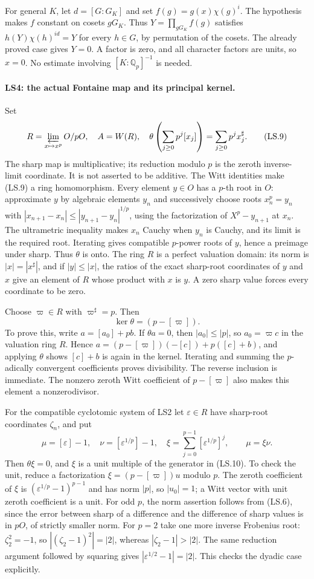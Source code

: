 For general $K$, let $d=[G:G_K]$ and set
$f(g)=g(x)\chi(g)^i$. The hypothesis makes $f$ constant on cosets
$gG_K$. Thus $Y=\prod_{gG_K}f(g)$ satisfies
$h(Y)\chi(h)^{id}=Y$ for every $h\in G$, by permutation of the
cosets. The already proved case gives $Y=0$. A factor is zero, and
all character factors are units, so $x=0$. No estimate involving
$[K:\mathbb Q_p]^{-1}$ is needed.

\paragraph{LS4: the actual Fontaine map and its principal kernel.}
Set
\[
 R=\varprojlim_{x\mapsto x^p}O/pO,\quad A=W(R),\quad
 \theta\left(\sum_{j\ge0}p^j[x_j]\right)
       =\sum_{j\ge0}p^j x_j^\sharp .                \tag{LS.9}
\]
The sharp map is multiplicative; its reduction modulo $p$ is the
zeroth inverse-limit coordinate. It is not asserted to be additive.
The Witt identities make (LS.9) a ring homomorphism. Every element $y\in O$ has a $p$-th root in $O$:
approximate $y$ by algebraic elements $y_n$ and successively
choose roots $x_n^p=y_n$ with
$|x_{n+1}-x_n|\le|y_{n+1}-y_n|^{1/p}$, using the factorization
of $X^p-y_{n+1}$ at $x_n$. The ultrametric inequality makes
$x_n$ Cauchy when $y_n$ is Cauchy, and its limit is the required
root. Iterating gives compatible $p$-power roots of $y$, hence
a preimage under sharp. Thus $\theta$ is onto. The ring $R$ is a perfect valuation domain:
its norm is $|x|=|x^\sharp|$, and if $|y|\le|x|$, the ratios of
the exact sharp-root coordinates of $y$ and $x$ give an element of
$R$ whose product with $x$ is $y$. A zero sharp value forces every
coordinate to be zero.

Choose $\varpi\in R$ with $\varpi^\sharp=p$. Then
\[
                 \ker\theta=(p-[\varpi]).          \tag{LS.10}
\]
To prove this, write $a=[a_0]+pb$. If $\theta a=0$, then
$|a_0|\le|p|$, so $a_0=\varpi c$ in the valuation ring $R$.
Hence
$a=(p-[\varpi])(-[c])+p([c]+b)$, and applying $\theta$ shows
$[c]+b$ is again in the kernel. Iterating and summing the
$p$-adically convergent coefficients proves divisibility. The
reverse inclusion is immediate. The nonzero zeroth Witt coefficient
of $p-[\varpi]$ also makes this element a nonzerodivisor.

For the compatible cyclotomic system of LS2 let
$\varepsilon\in R$ have sharp-root coordinates $\zeta_n$, and put
\[
 \mu=[\varepsilon]-1,\quad
 \nu=[\varepsilon^{1/p}]-1,\quad
 \xi=\sum_{j=0}^{p-1}[\varepsilon^{1/p}]^j,
 \qquad \mu=\xi\nu.                                \tag{LS.11}
\]
Then $\theta\xi=0$, and $\xi$ is a unit multiple of the generator
in (LS.10). To check the unit, reduce a factorization
$\xi=(p-[\varpi])u$ modulo $p$. The zeroth coefficient of $\xi$
is $(\varepsilon^{1/p}-1)^{p-1}$ and has norm $|p|$, so $|u_0|=1$;
a Witt vector with unit zeroth coefficient is a unit. For odd $p$,
the norm assertion follows from (LS.6), since the error between
sharp of a difference and the difference of sharp values is in
$pO$, of strictly smaller norm. For $p=2$ take one more inverse
Frobenius root: $\zeta_2^2=-1$, so
$|(\zeta_2-1)^2|=|2|$, whereas $|\zeta_2-1|>|2|$.
The same reduction argument followed by squaring gives
$|\varepsilon^{1/2}-1|=|2|$. This checks the dyadic case explicitly.

